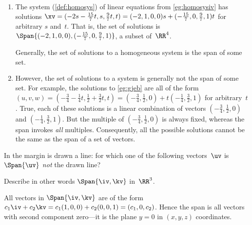 \begin{example}
\begin{enumerate}
\item The  system (\autoref{def:homosys}) of linear equations from \autoref{eg:homosysiv} has solutions \(\xv=(-2s-\frac{15}7t,s,\frac97t,t) =(-2,1,0,0)s+(-\frac{15}7,0,\frac97,1)t\) for arbitrary \(s\) and~\(t\).
That is, the set of solutions is \(\Span\{(-2,1,0,0),\linebreak[1](-\frac{15}7,0,\frac97,1)\}\), a subset of~\(\RR^4\).

Generally, the set of solutions to a homogeneous system is the span of some set.

\item However, the set of solutions to a  system is generally not the span of some set.  
For example, the solutions to \autoref{eg:gjeb} are all of the form \((u,v,w)=(-\frac34-\frac14t,\frac12+\frac32t,t) 
=(-\frac34,\frac12,0)+t(-\frac14,\frac32,1)\) for arbitrary~\(t\).
True, each of these solutions is a linear combination of vectors \((-\frac34,\frac12,0)\) and \((-\frac14,\frac32,1)\). 
But the multiple of \((-\frac34,\frac12,0)\) is always fixed, whereas the span invokes \emph{all} multiples.
Consequently, all the possible solutions cannot be the same as the span of a set of vectors.


\end{enumerate}
\end{example}



\begin{activity}
In the margin is drawn a line: 
%
for which one of the following vectors~\(\uv\) is \(\Span\{\uv\}\) \emph{not} the drawn line?
\end{activity}



\begin{reduce}
\begin{example} 
Describe in other words \(\Span\{\iv,\kv\}\) in~\(\RR^3\).

\begin{solution} 
All vectors in \(\Span\{\iv,\kv\}\) are of the form
\(c_1\iv+c_2\kv
=c_1(1,0,0)+c_2(0,0,1)
=(c_1,0,c_2)\).
Hence the span is all vectors with second component zero---it is the plane \(y=0\) in \((x,y,z)\) coordinates.
\end{solution}
\end{example}
\end{reduce}



